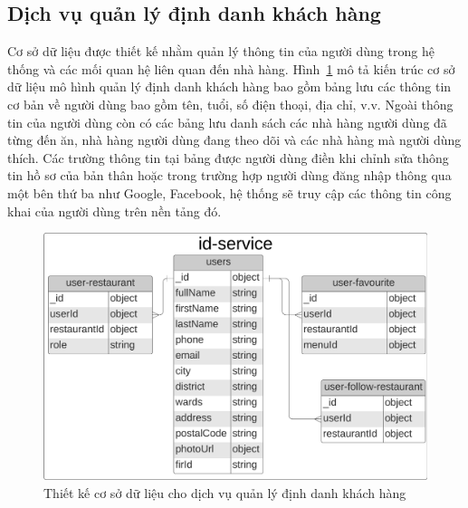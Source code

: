 \subsection{Dịch vụ quản lý định danh khách hàng}
Cơ sở dữ liệu  được thiết kế nhằm quản lý thông tin của người dùng trong hệ thống và các mối quan hệ liên quan đến nhà hàng.
Hình~\ref{fig:id-service-database-design} mô tả kiến trúc cơ sở dữ liệu mô hình quản lý định danh khách hàng bao gồm bảng  lưu các thông tin cơ bản về người dùng bao gồm tên, tuổi, số điện thoại, địa chỉ, v.v.
Ngoài thông tin của người dùng còn có các bảng lưu danh sách các nhà hàng người dùng đã từng đến ăn, nhà hàng người dùng đang theo dõi và các nhà hàng mà người dùng thích.
Các trường thông tin tại bảng  được người dùng điền khi chỉnh sửa thông tin hồ sơ của bản thân hoặc trong trường hợp người dùng đăng nhập thông qua một bên thứ ba như Google, Facebook, hệ thống sẽ truy cập các thông tin công khai của người dùng trên nền tảng đó.
\begin{figure}[H]
	\centering
	\includegraphics[width=\textwidth]{images/hChip/MongoDB/id-service-design.png}
	\caption{Thiết kế cơ sở dữ liệu cho dịch vụ quản lý định danh khách hàng}
	\label{fig:id-service-database-design}
\end{figure}

